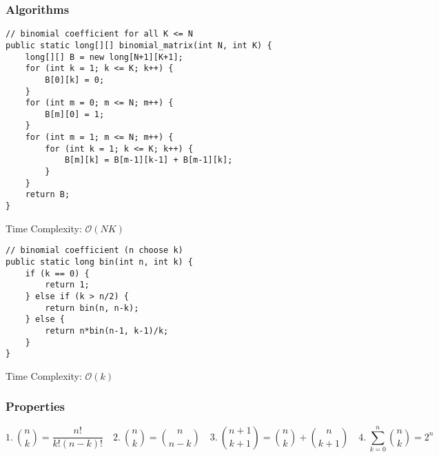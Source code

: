 \documentclass[9pt]{article}   	%
\begin{document}
\subsubsection{Algorithms}
\begin{minipage}{.5\textwidth}
\begin{lstlisting}
// binomial coefficient for all K <= N
public static long[][] binomial_matrix(int N, int K) {
	long[][] B = new long[N+1][K+1];
	for (int k = 1; k <= K; k++) { 
		B[0][k] = 0;
	}
	for (int m = 0; m <= N; m++) {
		B[m][0] = 1;
	}
	for (int m = 1; m <= N; m++) {
		for (int k = 1; k <= K; k++) {
			B[m][k] = B[m-1][k-1] + B[m-1][k];
		}
	}
	return B;
}
\end{lstlisting}
Time Complexity: $\mathcal{O}(NK)$
\end{minipage}
\begin{minipage}{.5\textwidth}
\begin{lstlisting}	
// binomial coefficient (n choose k)
public static long bin(int n, int k) {
	if (k == 0) {
		return 1;
	} else if (k > n/2) {
		return bin(n, n-k);
	} else {
		return n*bin(n-1, k-1)/k;
	}
}
\end{lstlisting}
Time Complexity: $\mathcal{O}(k)$
\end{minipage}

\subsubsection{Properties}
$$ 1.\ {n \choose k} = \frac{n!}{k! (n-k)!} \quad 2.\ {n \choose k} = {n \choose n-k} \quad 3.\ {n+1 \choose k+1}={n \choose k}+{n \choose k+1} \quad 4.\ \sum\limits_{k = 0}^{n} {n \choose k} = 2^n$$
\end{document}
